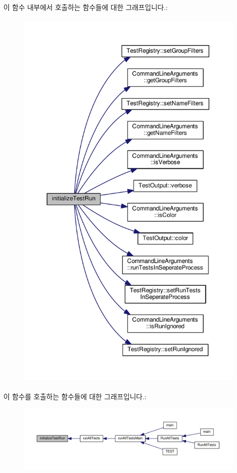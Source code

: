이 함수 내부에서 호출하는 함수들에 대한 그래프입니다.\+:
\nopagebreak
\begin{figure}[H]
\begin{center}
\leavevmode
\includegraphics[height=550pt]{class_command_line_test_runner_a5be751c5edcb3da7c175b6b1298ef433_cgraph}
\end{center}
\end{figure}




이 함수를 호출하는 함수들에 대한 그래프입니다.\+:
\nopagebreak
\begin{figure}[H]
\begin{center}
\leavevmode
\includegraphics[width=350pt]{class_command_line_test_runner_a5be751c5edcb3da7c175b6b1298ef433_icgraph}
\end{center}
\end{figure}


